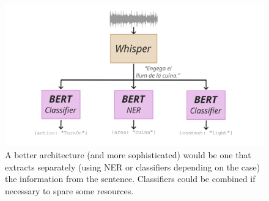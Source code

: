 \documentclass{article}
\begin{document}
\begin{figure}
    \centering
    \includegraphics[width=0.9\linewidth]{utopic.png}
    \caption{A better architecture (and more sophisticated) would be one that extracts separately (using NER or classifiers depending on the case) the information from the sentence. Classifiers could be combined if necessary to spare some resources.}
    \label{fig:utopic}
\end{figure}

% 


\end{document}
